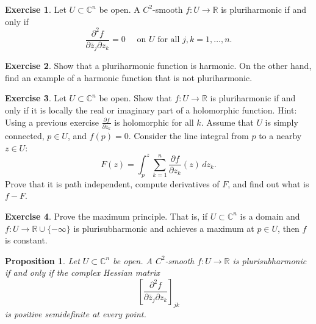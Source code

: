 \documentclass[12pt,openany]{book}
\newcommand{\C}{{\mathbb{C}}}
\newcommand{\R}{{\mathbb{R}}}
\theoremstyle{plain}
\newtheorem{prop}[thm]{Proposition}
\theoremstyle{remark}
\theoremstyle{definition}
\newenvironment{exbox}{%
    \def\FrameCommand{\vrule width 1pt \relax\hspace {10pt}}%
    \MakeFramed {\advance \hsize -\width \FrameRestore }%
}{%
    \endMakeFramed
}
\theoremstyle{exercise}
\newtheorem{exercise}{Exercise}[section]
\theoremstyle{example}
\begin{document}
\begin{exbox}
\begin{exercise}
Let $U \subset \C^n$ be open.
A $C^2$-smooth $f \colon U \to \R$ is pluriharmonic if and
only if
\begin{equation*}
\frac{\partial^2 f}{\partial \bar{z}_j \partial z_k} = 0
\quad \text{ on $U$ for all $j,k=1,\ldots,n$.}
\end{equation*}
\end{exercise}

\begin{exercise}
Show that a pluriharmonic function is harmonic.  On the other hand, find an
example of a harmonic function that is not pluriharmonic.
\end{exercise}

\begin{exercise}
Let $U \subset \C^n$ be open.
Show that $f \colon U \to \R$ is pluriharmonic if and
only if it is locally the real or imaginary part of a holomorphic function.
Hint:  Using a previous exercise
$\frac{\partial f}{\partial z_k}$ is holomorphic for all $k$.
Assume that $U$ is simply connected, $p \in U$, and
$f(p) = 0$.
Consider the line integral from $p$ to a nearby $z \in U$:
\begin{equation*}
F(z) =
\int_{p}^z \sum_{k=1}^n
\frac{\partial f}{\partial z_k}(z) \, dz_k .
\end{equation*}
Prove that it is path independent, compute derivatives of $F$, and
find out what is $f-F$.
\end{exercise}

\begin{exercise}
Prove the maximum principle.
That is, if $U \subset \C^n$ is a domain and $f \colon U \to \R \cup
\{-\infty\}$ is
plurisubharmonic and achieves a maximum at $p \in U$, then $f$ is constant.
\end{exercise}
\end{exbox}

\begin{samepage}
\begin{prop}
Let $U \subset \C^n$ be open.
A $C^2$-smooth $f \colon U \to \R$ is plurisubharmonic
if and only if the complex Hessian matrix
\begin{equation*}
\left[
\frac{\partial^2 f}{\partial \bar{z}_j \partial z_k}
\right]_{jk}
\end{equation*}
is positive semidefinite at every
point.
\end{prop}
\end{samepage}
\end{document}

